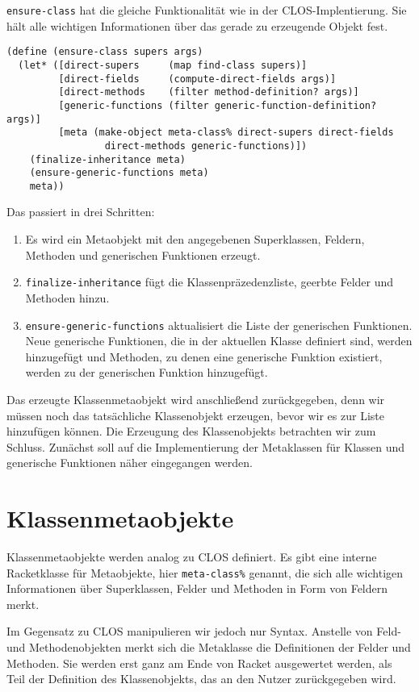 \texttt{ensure-class} hat die gleiche Funktionalität wie in der CLOS-Implentierung. Sie hält alle wichtigen Informationen über das gerade zu erzeugende Objekt fest. 

\begin{lstlisting}
(define (ensure-class supers args)
  (let* ([direct-supers     (map find-class supers)]  
         [direct-fields     (compute-direct-fields args)]
         [direct-methods    (filter method-definition? args)]
         [generic-functions (filter generic-function-definition? args)]
         [meta (make-object meta-class% direct-supers direct-fields
                 direct-methods generic-functions)])
    (finalize-inheritance meta)
    (ensure-generic-functions meta)
    meta))
\end{lstlisting}


Das passiert in drei Schritten:
\begin{enumerate}
 \item Es wird ein Metaobjekt mit den angegebenen Superklassen, Feldern, Methoden und generischen Funktionen erzeugt.
 \item \texttt{finalize-inheritance} fügt die Klassenpräzedenzliste, geerbte Felder und Methoden hinzu.
 \item \texttt{ensure-generic-functions} aktualisiert die Liste der generischen Funktionen. Neue generische Funktionen, die in der aktuellen Klasse definiert sind, werden hinzugefügt und Methoden, zu denen eine generische Funktion existiert, werden zu der generischen Funktion hinzugefügt.
\end{enumerate}

Das erzeugte Klassenmetaobjekt wird anschließend zurückgegeben, denn wir müssen noch das tatsächliche Klassenobjekt erzeugen, bevor wir es zur Liste hinzufügen können. Die Erzeugung des Klassenobjekts betrachten wir zum Schluss. Zunächst soll auf die Implementierung der Metaklassen für Klassen und generische Funktionen näher eingegangen werden.

\section{Klassenmetaobjekte}
Klassenmetaobjekte werden analog zu CLOS definiert. Es gibt eine interne Racketklasse für Metaobjekte, hier \texttt{meta-class\%} genannt, die sich alle wichtigen Informationen über Superklassen, Felder und Methoden in Form von Feldern merkt.

Im Gegensatz zu CLOS manipulieren wir jedoch nur Syntax. Anstelle von Feld- und Methodenobjekten merkt sich die Metaklasse die Definitionen der Felder und Methoden. Sie werden erst ganz am Ende von Racket ausgewertet werden, als Teil der Definition des Klassenobjekts, das an den Nutzer zurückgegeben wird.

